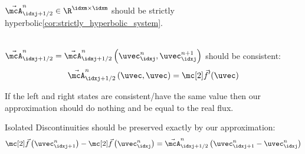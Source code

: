   \begin{propertybox}\nospacing
      \begin{property}\label{property:strict_hyperbolicity}\leavevmode\\
          $\linfluxvec_{\idxj+1/2}^{n}\in\R^{\idxm\times\idxm}$ should be strictly hyperbolic\cref{cor:strictly_hyperbolic_system}.
      \end{property}
  \end{propertybox}
  \begin{propertybox}\nospacing
      \begin{property}[Consistency]\label{property:consistency}\leavevmode\\
          $\linfluxvec_{\idxj+1/2}^{n}=\linfluxvec_{\idxj+1/2}^{n}\left(\uvec_{\idxj}^{n},\uvec_{\idxj}^{n+1}\right)$ should be consistent:
          \begin{align}
            \linfluxvec_{\idxj+1/2}^{n}\left(\uvec,\uvec\right)=\fluxvec'(\uvec)\label{eq:property:consistency}
          \end{align}
      \end{property}
  \end{propertybox}
\begin{explanationbox}\nospacing
    \begin{explanation}
        If the left and right states are consistent/have the same value then our approximation should do nothing and be equal to the real flux.
    \end{explanation}
\end{explanationbox}
  \begin{propertybox}\nospacing
      \begin{property}\label{property:roes_criterion}
          Isolated Discontinuities should be preserved exactly by our approximation:
          \begin{align}
            \fluxvec\left(\uvec_{\idxj+1}^{n}\right)-\fluxvec\left(\uvec_{\idxj}^{n}\right)=\linfluxvec_{\idxj+1/2}^{n}\left(\uvec_{\idxj+1}^{n}-\uvec_{\idxj}^{n}\right)
            \label{eq:roes_criterion_non_linear_systems}
          \end{align}
      \end{property}
  \end{propertybox}


